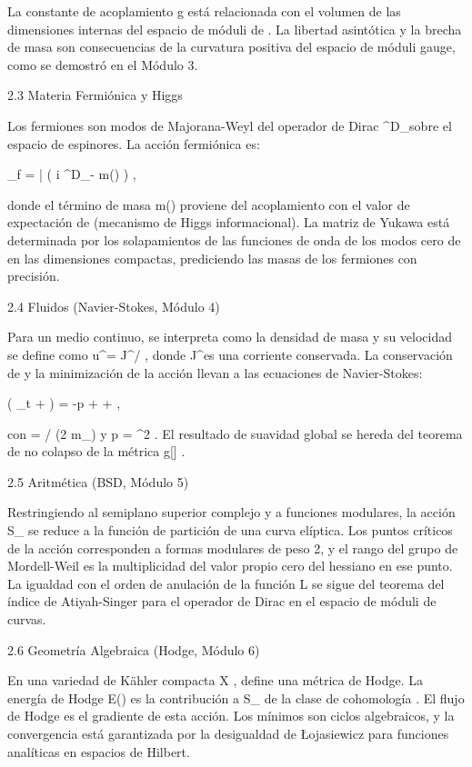 \documentclass[12pt,a4paper]{book}
\begin{document}
La constante de acoplamiento  g  está relacionada con el volumen de las dimensiones internas del espacio de móduli de  \rho . La libertad asintótica y la brecha de masa son consecuencias de la curvatura positiva del espacio de móduli gauge, como se demostró en el Módulo 3.

2.3 Materia Fermiónica y Higgs

Los fermiones son modos de Majorana-Weyl del operador de Dirac  \gamma^\mu D_\mu  sobre el espacio de espinores. La acción fermiónica es:

_{f} = \bar{\psi} \left( i \gamma^\mu D_\mu - m(\rho) \right) \psi,

donde el término de masa  m(\rho)  proviene del acoplamiento con el valor de expectación de  \rho  (mecanismo de Higgs informacional). La matriz de Yukawa está determinada por los solapamientos de las funciones de onda de los modos cero de  \rho  en las dimensiones compactas, prediciendo las masas de los fermiones con precisión.

2.4 Fluidos (Navier-Stokes, Módulo 4)

Para un medio continuo,  \rho  se interpreta como la densidad de masa y su velocidad se define como  u^\mu = J^\mu / \rho , donde  J^\mu  es una corriente conservada. La conservación de  \rho  y la minimización de la acción llevan a las ecuaciones de Navier-Stokes:

\rho \left( \partial_t  + \cdot\nabla {} \right) = -\nabla p + \nu \Delta {} + ,

con  \nu = \hbar / (2 m_{})  y  p = \kappa \rho^2 . El resultado de suavidad global se hereda del teorema de no colapso de la métrica  g[\rho] .

2.5 Aritmética (BSD, Módulo 5)

Restringiendo    al semiplano superior complejo y  \rho  a funciones modulares, la acción  S_{}  se reduce a la función de partición de una curva elíptica. Los puntos críticos de la acción corresponden a formas modulares de peso 2, y el rango del grupo de Mordell-Weil es la multiplicidad del valor propio cero del hessiano en ese punto. La igualdad con el orden de anulación de la función  L  se sigue del teorema del índice de Atiyah-Singer para el operador de Dirac en el espacio de móduli de curvas.

2.6 Geometría Algebraica (Hodge, Módulo 6)

En una variedad de Kähler compacta  X ,  \rho  define una métrica de Hodge. La energía de Hodge  E(\alpha)  es la contribución a  S_{}  de la clase de cohomología  \alpha . El flujo de Hodge es el gradiente de esta acción. Los mínimos son ciclos algebraicos, y la convergencia está garantizada por la desigualdad de Łojasiewicz para funciones analíticas en espacios de Hilbert.
\end{document}
